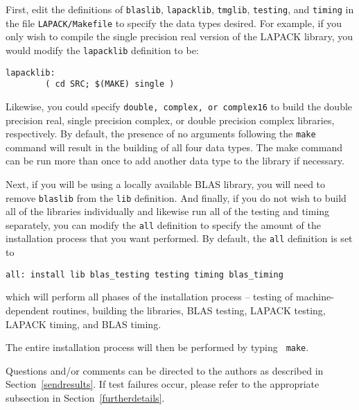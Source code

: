 First, edit the definitions of {\tt blaslib}, {\tt lapacklib},
{\tt tmglib}, {\tt testing}, and {\tt timing} in the file {\tt LAPACK/Makefile}
to specify the data types desired.  For example,
if you only wish to compile the single precision real version of the
LAPACK library, you would modify the {\tt lapacklib} definition to be:

\begin{verbatim}
lapacklib:
        ( cd SRC; $(MAKE) single )
\end{verbatim}

Likewise, you could specify {\tt double, complex, or complex16} to
build the double precision real, single precision complex, or double
precision complex libraries, respectively.  By default, the presence of
no arguments following the {\tt make} command will result in the
building of all four data types.
The make command can be run more than once to add another
data type to the library if necessary.

      
Next, if you will be using a locally available BLAS library, you will need
to remove {\tt blaslib} from the {\tt lib} definition.  And finally,
if you do not wish to build all of the libraries individually and
likewise run all of the testing and timing separately, you can
modify the {\tt all} definition to specify the amount of the
installation process that you want performed.  By default,
the {\tt all} definition is set to
\begin{verbatim}
all: install lib blas_testing testing timing blas_timing
\end{verbatim}
which will perform all phases of the installation
process -- testing of machine-dependent routines, building the libraries,
BLAS testing, LAPACK testing, LAPACK timing, and BLAS timing.

The entire installation process will then be performed by typing {\tt
make}.

Questions and/or comments can be directed to the
authors as described in Section~\ref{sendresults}.  If test failures
occur, please refer to the appropriate subsection in
Section~\ref{furtherdetails}.

